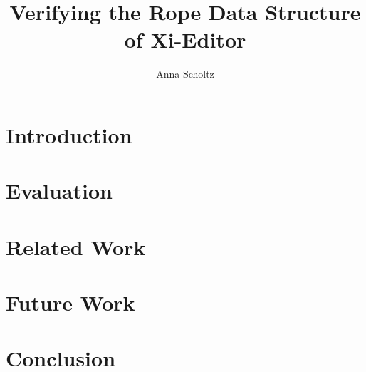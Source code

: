 \documentclass[sigconf]{acmart}
\begin{document}
\title{Verifying the Rope Data Structure of Xi-Editor}


\author{Anna Scholtz}



\begin{abstract}

\end{abstract}





\maketitle

\section{Introduction}
\label{sec:introduction}


\section{Evaluation}
\label{sec:evaluation}


\section{Related Work}
\label{sec:related-work}


\section{Future Work}
\label{sec:future-work}



\section{Conclusion}
\label{sec:conclusion}




\end{document}
